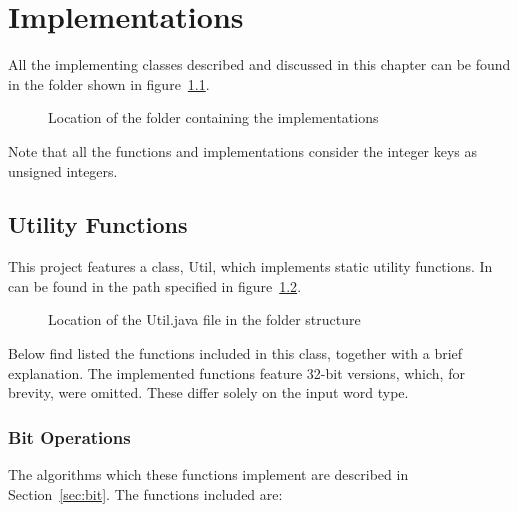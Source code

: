 \chapter{Implementations} \label{sec:implementationsChapter}

All the implementing classes described and discussed in this chapter can be found in the folder shown in figure~\ref{fig:implementationsFolderTree}.

\begin{figure}[H]
\caption{Location of the folder containing the implementations}
\label{fig:implementationsFolderTree}
\end{figure}

Note that all the functions and implementations consider the integer keys as unsigned integers.

\section{Utility Functions} \label{sec:utilFuctionsImplementation}

This project features a class, {\ttfamily Util}, which implements static utility functions. In can be found in the path specified in figure~\ref{fig:utilFunctionsTree}.

\begin{figure}[H]
\caption{Location of the {\ttfamily Util.java} file in the folder structure}
\label{fig:utilFunctionsTree}
\end{figure}

Below find listed the functions included in this class, together with a brief explanation.
The implemented functions feature 32-bit versions, which, for brevity, were omitted. These differ solely on the input word type.

\subsection{Bit Operations}
The algorithms which these functions implement are described in Section~\ref{sec:bit}.
The functions included are:

